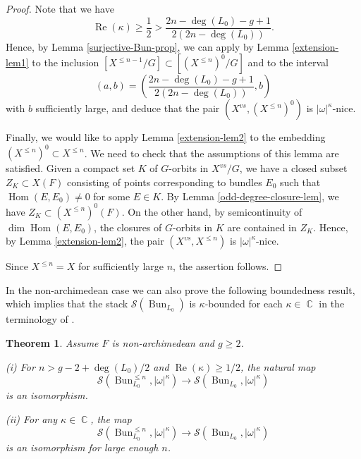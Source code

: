 \documentclass[12pt,reqno]{amsart}
\DeclareMathOperator\C{\mathbb C}
\newtheorem{theorem}{Theorem}[section]
\theoremstyle{definition}
\theoremstyle{remark}
\numberwithin{equation}{section}
\newcommand{\Hom}{\operatorname{Hom}}
\renewcommand{\SS}{{\mathcal S}}
\newcommand{\sub}{\subset}
\newcommand{\om}{\omega}
\newcommand{\Bun}{{\operatorname{Bun}}}
\renewcommand{\Re}{{\operatorname{Re}}}
\begin{document}
\begin{proof}
Note that we have
$$\operatorname{Re}(\kappa)\ge \frac{1}{2}>\frac{2n-\deg(L_0)-g+1}{2(2n-\deg(L_0))}.$$
Hence, by Lemma \ref{surjective-Bun-prop}, we can apply by Lemma \ref{extension-lem1}
to the inclusion
$[X^{\le n-1}/G]\sub [(X^{\le n})^0/G]$ and to the interval 
$$(a,b)=(\frac{2n-\deg(L_0)-g+1}{2(2n-\deg(L_0))},b)$$
with $b$ sufficiently large,
and deduce that the pair $(X^{vs},(X^{\le n})^0)$ is $|\om|^{\kappa}$-nice. 

Finally, we would like to apply Lemma \ref{extension-lem2} to the embedding $(X^{\le n})^0\sub X^{\le n}$.
We need to check that the assumptions of this lemma are satisfied. Given a compact set $K$ of $G$-orbits in $X^{vs}/G$,
we have a closed subset $Z_K\sub X(F)$ consisting of points corresponding to bundles $E_0$ such that $\Hom(E,E_0)\neq 0$ for some $E\in K$.
By Lemma \ref{odd-degree-closure-lem}, we have $Z_K\sub (X^{\le n})^0(F)$. On the other hand, by semicontinuity of $\dim\Hom(E,E_0)$,
the closures of $G$-orbits in $K$ are contained in $Z_K$. Hence, by Lemma \ref{extension-lem2}, the pair $(X^{vs},X^{\le n})$ is $|\om|^{\kappa}$-nice.

Since $X^{\le n}=X$ for sufficiently large $n$, the assertion follows.
\end{proof}

In the non-archimedean case we can also prove the following boundedness result, which implies that the stack $\SS(\Bun_{L_0})$ is $\kappa$-bounded for each $\kappa\in\C$
in the terminology of \cite[Def.\ 2.10]{BK}.

\begin{theorem}\label{main-thm-bound}
Assume $F$ is non-archimedean and $g\ge 2$. 

\noindent
(i) For $n>g-2+\deg(L_0)/2$ and $\Re(\kappa)\ge 1/2$, the natural map
$$\SS(\Bun_{L_0}^{\le n},|\om|^{\kappa})\to \SS(\Bun_{L_0},|\om|^{\kappa})$$
is an isomorphism. 

\noindent
(ii) For any $\kappa\in\C$, the map
$$\SS(\Bun_{L_0}^{\le n},|\om|^{\kappa})\to \SS(\Bun_{L_0},|\om|^{\kappa})$$
is an isomorphism for large enough $n$.
\end{theorem}
\end{document}
